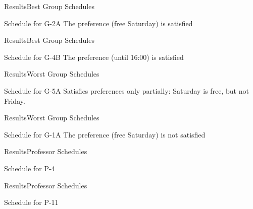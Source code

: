 

\begin{frame}{Results}{Best Group Schedules}
  \begin{block}{Schedule for G-2A}
    The preference (free Saturday) is satisfied \\\medskip
    \centering
  \end{block}
\end{frame}

\begin{frame}{Results}{Best Group Schedules}
  \begin{block}{Schedule for G-4B}
    The preference (until 16:00) is satisfied \\\medskip
    \centering
  \end{block}
\end{frame}

\begin{frame}{Results}{Worst Group Schedules}
  \begin{block}{Schedule for G-5A}
    Satisfies preferences only partially: Saturday is free, but not Friday.
    \\\medskip
    \centering
  \end{block}
\end{frame}

\begin{frame}{Results}{Worst Group Schedules}
  \begin{block}{Schedule for G-1A}
    The preference (free Saturday) is not satisfied \\\medskip
    \centering
  \end{block}
\end{frame}

\begin{frame}{Results}{Professor Schedules}
  \begin{block}{Schedule for P-4}
    \centering \bigskip
  \end{block}
\end{frame}

\begin{frame}{Results}{Professor Schedules}
  \begin{block}{Schedule for P-11}
    \centering \bigskip
  \end{block}
\end{frame}
